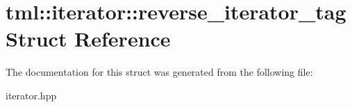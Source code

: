 \hypertarget{structtml_1_1iterator_1_1reverse__iterator__tag}{\section{tml\+:\+:iterator\+:\+:reverse\+\_\+iterator\+\_\+tag Struct Reference}
\label{structtml_1_1iterator_1_1reverse__iterator__tag}
}


The documentation for this struct was generated from the following file\+:\begin{DoxyCompactItemize}
\item 
iterator.\+hpp\end{DoxyCompactItemize}
